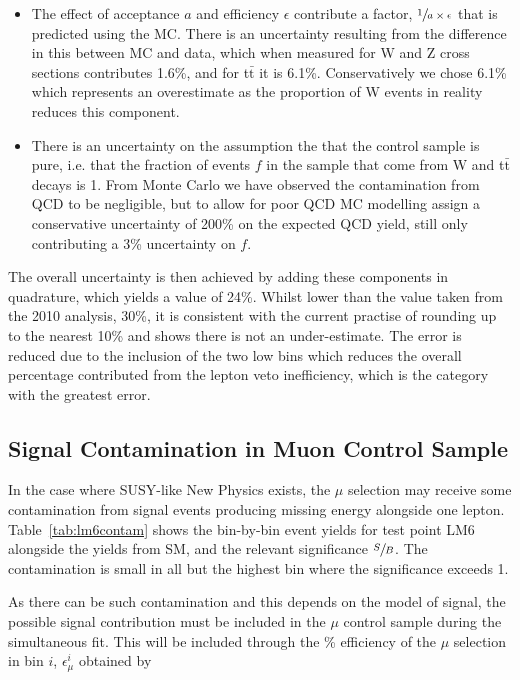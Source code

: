 \begin{itemize}
\begin{itemize}
\end{itemize}
\item The effect of acceptance $a$ and efficiency $\epsilon$ contribute a factor, $\sfrac{1}{a \times \epsilon}$ that is predicted using the MC. There is an uncertainty resulting from the difference in this between MC and data, which when measured for W and Z cross sections contributes 1.6\%, and for t$\bar{\textrm{t}}$ it is 6.1\%. Conservatively we chose 6.1\% which represents an overestimate as the proportion of W events in reality reduces this component.
\item There is an uncertainty on the assumption the that the control sample is pure, i.e. that the fraction of events $f$ in the sample that come from W and t$\bar{\textrm{t}}$ decays is 1. From Monte Carlo we have observed the contamination from QCD to be negligible, but to allow for poor QCD MC modelling assign a conservative uncertainty of 200\% on the expected QCD yield, still only contributing a 3\% uncertainty on $f$.
\end{itemize}

The overall uncertainty is then achieved by adding these components in quadrature, which yields a value of 24\%. Whilst lower than the value taken from the 2010 analysis, 30\%, it is consistent with the current practise of rounding up to the nearest 10\% and shows there is not an under-estimate. The error is reduced due to the inclusion of the two low \HT bins which reduces the overall percentage contributed from the lepton veto inefficiency, which is the category with the greatest error. 

\subsection{Signal Contamination in Muon Control Sample}
\label{sec:sigmucon}
In the case where SUSY-like New Physics exists, the $\mu$ selection may receive some contamination from signal events producing missing energy alongside one lepton. Table~\ref{tab:lm6contam} shows the bin-by-bin event yields for test point LM6 alongside the yields from SM, and the relevant significance $\sfrac{S}{B}$. The contamination is small in all but the highest bin where the significance exceeds 1. 

As there can be such contamination and this depends on the model of signal, the possible signal contribution must be included in the $\mu$ control sample during the simultaneous fit. This will be included through the \% efficiency of the $\mu$ selection in bin $i$, $\epsilon^{i}_{\mu}$ obtained by

